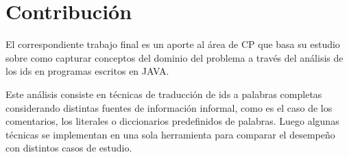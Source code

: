 \documentclass[a4paper,12pt]{report}
\begin{document}
\pagebreak 
\section{Contribución}

El correspondiente trabajo final es un aporte al área de CP que basa su estudio sobre como capturar conceptos del dominio del problema a través del análisis de los ids en programas escritos en JAVA. 

Este análisis consiste en técnicas de traducción de ids a palabras completas considerando distintas fuentes de información informal, como es el caso de los comentarios, los literales o diccionarios predefinidos de palabras. Luego algunas técnicas se implementan en una sola herramienta para comparar el desempeño con distintos casos de estudio.



%
%
%
%
%
%
\end{document}
